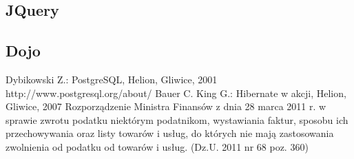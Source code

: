 \subsection{JQuery}

\subsection{Dojo}
\newpage
\begin{thebibliography}{szerokosc}
Dybikowski Z.: PostgreSQL, Helion, Gliwice, 2001
http://www.postgresql.org/about/
Bauer C. King G.: Hibernate w akcji, Helion, Gliwice, 2007
Rozporządzenie Ministra Finansów z dnia 28 marca
2011 r.
w sprawie zwrotu podatku niektórym podatnikom, wystawiania faktur, sposobu ich
przechowywania oraz listy towarów i usług, do których nie mają zastosowania
zwolnienia od podatku od towarów i usług. (Dz.U. 2011 nr 68 poz. 360)
\end{thebibliography}